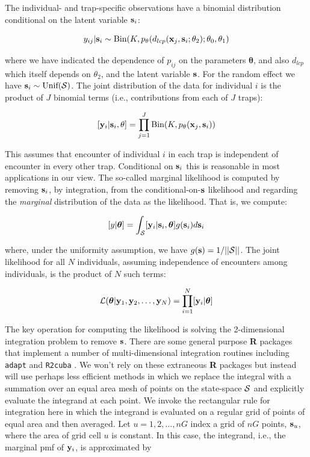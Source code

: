 \documentclass[12pt]{article}
\begin{document}
The individual- and trap-specific observations have a binomial
distribution conditional on the latent variable ${\bf s}_{i}$:

\begin{equation}
	y_{ij}| {\bf s}_{i} \sim \mbox{Bin}(K, p_{\theta}(d_{lcp}({\bf x}_{j},{\bf s}_{i};\theta_{2}); \theta_{0}, \theta_{1})
\label{mle.eq.cond-on-s}
\end{equation}

{\flushleft where} we have indicated the dependence of $p_{ij}$ on the parameters
${\bm \theta}$, and also $d_{lcp}$ which
itself depends on $\theta_{2}$, and the latent variable ${\bf s}$.
For the random effect we have ${\bf s}_{i} \sim  \mbox{Unif}({\cal
  S})$.
The joint distribution of the data for individual $i$ is the product
of $J$ binomial terms (i.e., contributions from each of $J$ traps):

\[
  [{\bf y}_{i} | {\bf s}_{i} , \theta] =
  \prod_{j=1}^{J} \mbox{Bin}(K, p_{\theta}({\bf x}_{j},{\bf s}_{i}) )
\]

{\flushleft This} assumes that encounter of individual $i$ in each
trap is independent of encounter in every other trap. Conditional on
${\bf s}_{i}$ this is reasonable in most applications in our view.
 The so-called marginal likelihood is computed by removing
${\bf s}_{i}$, by integration,  from the conditional-on-${\bf s}$
likelihood and regarding the {\it marginal} distribution of the data
as the likelihood. That
is, we compute:

\[
  [y|{\bm \theta}] =
\int_{{\cal S}}  [ {\bf y}_{i} |{\bf s}_{i},{\bm \theta}] g({\bf s}_{i}) d{\bf s}_{i}
\]

{\flushleft where}, under the uniformity assumption, we have
$g({\bf s}) = 1/||{\cal S}||$.
The joint likelihood for all $N$ individuals, assuming independence of
encounters among individuals, is the product of $N$ such terms:

\[
{\cal L}({\bm \theta} | {\bf y}_{1},{\bf y}_{2},\ldots, {\bf y}_{N}) = \prod_{i=1}^{N}
[{\bf y}_{i}|{\bm \theta}]
\]

The key operation for computing the likelihood is solving the
2-dimensional integration problem to remove ${\bf s}$. There are some
general purpose {\bf R} packages that implement a number of
multi-dimensional integration routines including \mbox{\tt adapt}
\citep{genz_etal:2007} and \mbox{\tt R2cuba} \citep{hahn_etal:2011}.
We won't rely on these extraneous {\bf R} packages but instead will
use perhaps less efficient methods in which we replace the integral
with a summation over an equal area mesh of points on the state-space
${\cal S}$ and explicitly evaluate the integrand at each point. We
invoke the rectangular rule for integration here in which the
integrand is evaluated on a regular grid of points of equal area and
then averaged.  Let $u=1,2,\ldots,nG$ index a grid of $nG$ points,
${\bf s}_{u}$, where the area of grid cell $u$ is constant.  In this
case, the integrand, i.e., the marginal pmf of ${\bf y}_{i}$, is
approximated by
\end{document}
